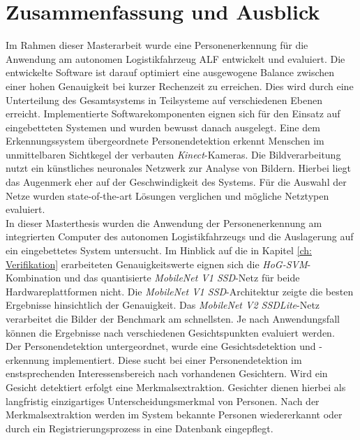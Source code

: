 \chapter{Zusammenfassung und Ausblick}
\label{Fazit und Ausblick}
	
Im Rahmen dieser Masterarbeit wurde eine Personenerkennung für die Anwendung am autonomen Logistikfahrzeug ALF entwickelt und evaluiert. Die entwickelte Software ist darauf optimiert eine ausgewogene Balance zwischen einer hohen Genauigkeit bei kurzer Rechenzeit zu erreichen. Dies wird durch eine Unterteilung des Gesamtsystems in Teilsysteme auf verschiedenen Ebenen erreicht. Implementierte Softwarekomponenten eignen sich für den Einsatz auf eingebetteten Systemen und wurden bewusst danach ausgelegt. Eine dem Erkennungssystem übergeordnete Personendetektion erkennt Menschen im unmittelbaren Sichtkegel der verbauten \textit{Kinect}-Kameras. Die Bildverarbeitung nutzt ein künstliches neuronales Netzwerk zur Analyse von Bildern. Hierbei liegt das Augenmerk eher auf der Geschwindigkeit des Systems. Für die Auswahl der Netze wurden state-of-the-art Lösungen verglichen und mögliche Netztypen evaluiert.\\

In dieser Masterthesis wurden die Anwendung der Personenerkennung am integrierten Computer des autonomen Logistikfahrzeugs und die Auslagerung auf ein eingebettetes System untersucht. Im Hinblick auf die in Kapitel \ref{ch: Verifikation} erarbeiteten Genauigkeitswerte eignen sich die \textit{HoG-SVM}-Kombination und das quantisierte \textit{MobileNet V1 SSD}-Netz für beide Hardwareplattformen nicht. Die \textit{MobileNet V1 SSD}-Architektur zeigte die besten Ergebnisse hinsichtlich der Genauigkeit. Das \textit{MobileNet V2 SSDLite}-Netz verarbeitet die Bilder der Benchmark am schnellsten. Je nach Anwendungsfall können die Ergebnisse nach verschiedenen Gesichtspunkten evaluiert werden.     \\

Der Personendetektion untergeordnet, wurde eine Gesichtsdetektion und -erkennung implementiert. Diese sucht bei einer Personendetektion im enstsprechenden Interessensbereich nach vorhandenen Gesichtern. Wird ein Gesicht detektiert erfolgt eine Merkmalsextraktion. Gesichter dienen hierbei als langfristig einzigartiges Unterscheidungsmerkmal von Personen. Nach der Merkmalsextraktion werden im System bekannte Personen wiedererkannt oder durch ein Registrierungsprozess in eine Datenbank eingepflegt.\\

